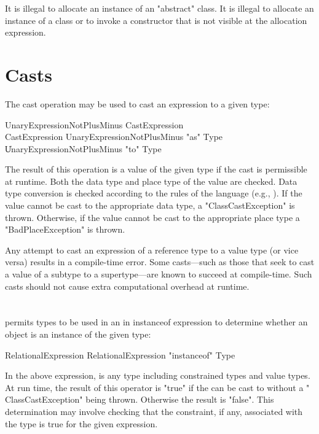 It is illegal to allocate an instance of an \xcd"abstract" class.
It is illegal to allocate an instance of a class or to invoke a
constructor that is not visible at
the allocation expression.


\section{Casts}\label{ClassCast}

The cast operation may be used to cast an expression to a given type:

\begin{grammar}
UnaryExpressionNotPlusMinus \: CastExpression \\
CastExpression \: UnaryExpressionNotPlusMinus \xcd"as" Type \\
\| UnaryExpressionNotPlusMinus \xcd"to" Type \\
\end{grammar}

The result of this operation is a value of the given type if the cast
is permissible at runtime. Both the data type and place type of the
value are checked. Data type conversion is checked according to the
rules of the \java{} language (e.g., \cite[\S 5.5]{jls2}). If the
value cannot be cast to the appropriate data type, a
\xcd"ClassCastException"
is thrown. Otherwise, if the value cannot be cast to the
appropriate place type a \xcd"BadPlaceException" is thrown. 

Any attempt to cast an expression of a reference type to a value type
(or vice versa) results in a compile-time error. Some casts---such as
those that seek to cast a value of a subtype to a supertype---are
known to succeed at compile-time. Such casts should not cause extra
computational overhead at runtime.

\section{}\label{instanceOf}

\Xten{} permits types to be used in an in instanceof expression
to determine whether an object is an instance of the given type:

\begin{grammar}
RelationalExpression \: RelationalExpression \xcd"instanceof" Type
\end{grammar}

In the above expression,  is any type including
constrained types and value types. 
At run time, the result of this operator is
\xcd"true" if the  can be cast
to  without a \xcd" ClassCastException" being
thrown.  Otherwise the result is \xcd"false".
This determination may involve checking
that the
constraint, if any, associated with the type is true for the
given expression.

